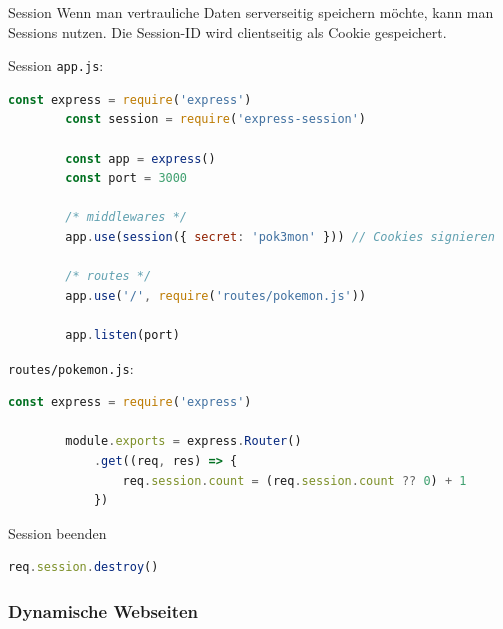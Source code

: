 \begin{defi}{Session}
    Wenn man vertrauliche Daten serverseitig speichern möchte, kann man Sessions nutzen.
    Die Session-ID wird clientseitig als Cookie gespeichert.
\end{defi}

\begin{example}{Session}
    \texttt{app.js}:
    \begin{lstlisting}[language=JavaScript]
        const express = require('express')
        const session = require('express-session')
        
        const app = express()
        const port = 3000

        /* middlewares */
        app.use(session({ secret: 'pok3mon' })) // Cookies signieren

        /* routes */
        app.use('/', require('routes/pokemon.js'))

        app.listen(port)
    \end{lstlisting}

    \texttt{routes/pokemon.js}:
    \begin{lstlisting}[language=JavaScript]
        const express = require('express')
        
        module.exports = express.Router()
            .get((req, res) => {
                req.session.count = (req.session.count ?? 0) + 1
            })
    \end{lstlisting}
\end{example}

\begin{example}{Session beenden}
    \begin{lstlisting}[language=JavaScript]
        req.session.destroy()
    \end{lstlisting}
\end{example}

\subsubsection{Dynamische Webseiten}

